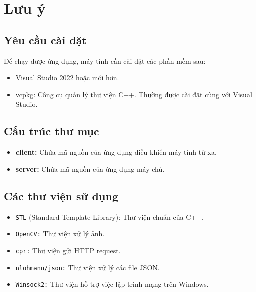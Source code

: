 \section{Lưu ý}
\subsection{Yêu cầu cài đặt}

Để chạy được ứng dụng, máy tính cần cài đặt các phần mềm sau:
\begin{itemize}
    \item Visual Studio 2022 hoặc mới hơn.
    \item vcpkg: Công cụ quản lý thư viện C++. Thường được cài đặt cùng với Visual Studio.
\end{itemize}

\subsection{Cấu trúc thư mục}
\begin{itemize}
    \item \textbf{client:} Chứa mã nguồn của ứng dụng điều khiển máy tính từ xa.
    \item \textbf{server:} Chứa mã nguồn của ứng dụng máy chủ.
\end{itemize}

\subsection{Các thư viện sử dụng}
\begin{itemize}
    \item \texttt{STL} (Standard Template Library): Thư viện chuẩn của C++.
    \item \texttt{OpenCV:} Thư viện xử lý ảnh.
    \item \texttt{cpr:} Thư viện gửi HTTP request.
    \item \texttt{nlohmann/json:} Thư viện xử lý các file JSON.
    \item \texttt{Winsock2:} Thư viện hỗ trợ việc lập trình mạng trên Windows.
\end{itemize}